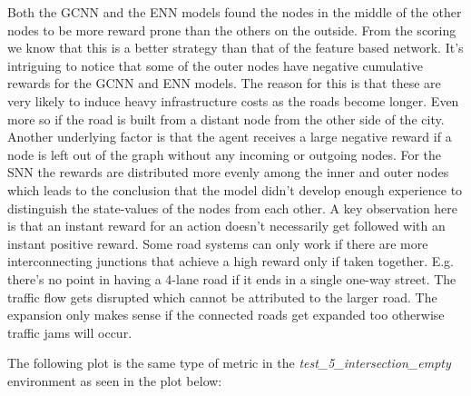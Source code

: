 \documentclass[
]{elteikthesis}[2023/04/10]
\begin{document}
Both the GCNN and the ENN models found the nodes in the middle of
the other nodes to be more reward prone than the others on the outside.
From the scoring we know that this is a better strategy than that
of the feature based network. It's intriguing to notice that some
of the outer nodes have negative cumulative rewards for the GCNN and
ENN models. The reason for this is that these are very likely to induce
heavy infrastructure costs as the roads become longer. Even more so
if the road is built from a distant node from the other side of the
city. Another underlying factor is that the agent receives a large
negative reward if a node is left out of the graph without any incoming
or outgoing nodes. For the SNN the rewards are distributed more evenly
among the inner and outer nodes which leads to the conclusion that
the model didn't develop enough experience to distinguish the state-values
of the nodes from each other. A key observation here is that an instant reward
for an action doesn't necessarily get followed with an instant positive reward.
Some road systems can only work if there are more interconnecting junctions
that achieve a high reward only if taken together. E.g. there's no point in 
having a 4-lane road if it ends in a single one-way street. The traffic flow 
gets disrupted which cannot be attributed to the larger road. The expansion
only makes sense if the connected roads get expanded too otherwise traffic jams
will occur.

The following plot is the same type of metric in the \emph{test\_5\_intersection\_empty}
environment as seen in the plot below: 
\end{document}
